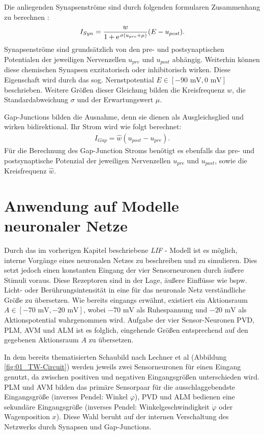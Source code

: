 	Die anliegenden Synapsenströme sind durch folgenden formularen Zusammenhang zu berechnen \cite{WormLevelRL}:
	\begin{align}
		\label{eq:chem_syn_current}
		I_{Syn} = \frac{w}{1 + \e^{\sigma(u_{pre} + \mu)}}(E - u_{post})\text{.}
	\end{align}
	Synapsenströme sind grundsätzlich von den pre- und postsynaptischen Potentialen der jeweiligen Nervenzellen $u_{pre}$ und $u_{post}$ abhängig. Weiterhin können diese chemischen Synapsen exzitatorisch oder inhibitorisch wirken. Diese Eigenschaft wird durch das sog. Nernstpotential $E\in[-90\text{ mV}, 0\text{ mV}]$ beschrieben. Weitere Größen dieser Gleichung bilden die Kreisfrequenz $w$, die Standardabweichung $\sigma$ und der Erwartungswert $\mu$.
	
	Gap-Junctions bilden die Ausnahme, denn sie dienen als Ausgleichsglied und wirken bidirektional. Ihr Strom wird wie folgt berechnet:
	\begin{align}
		\label{eq:gap_syn_current}
		I_{Gap} = \hat{w}(u_{post} - u_{pre})\text{.}
	\end{align}
	Für die Berechnung des Gap-Junction Stroms benötigt es ebenfalls das pre- und postsynaptische Potenzial der jeweiligen Nervenzellen $u_{pre}$ und $u_{post}$, sowie die Kreisfrequenz $\hat{w}$.\newpage
	
\section{Anwendung auf Modelle neuronaler Netze}
\label{sec:lif_neuro}
	Durch das im vorherigen Kapitel beschriebene \textit{LIF} - Modell ist es möglich, interne Vorgänge eines neuronalen Netzes zu beschreiben und zu simulieren. Dies setzt jedoch einen konstanten Eingang der vier Sensorneuronen durch äußere Stimuli voraus. Diese Rezeptoren sind in der Lage, äußere Einflüsse wie bspw. Licht- oder Berührungsintensität in eine für das neuronale Netz verständliche Größe zu übersetzen. Wie bereits eingangs erwähnt, existiert ein Aktionsraum $A\in[-70\text{ mV}, -20\text{ mV}]$, wobei $-70\text{ mV}$ als Ruhespannung und $-20\text{ mV}$ als Aktionspotential wahrgenommen wird. Aufgabe der vier Sensor-Neuronen PVD, PLM, AVM und ALM ist es folglich, eingehende Größen entsprechend auf den gegebenen Aktionsraum $A$ zu übersetzen.
	
	In dem bereits thematisierten Schaubild nach Lechner et al (Abbildung \ref{fig:01_TW-Circuit}) werden jeweils zwei Sensorneuronen für einen Eingang genutzt, da zwischen positiven und negativen Eingangsgrößen unterschieden wird. PLM und AVM bilden das primäre Sensorpaar für die ausschlaggebendste Eingangsgröße (inverses Pendel: Winkel $\varphi$), PVD und ALM bedienen eine sekundäre Eingangsgröße (inverses Pendel: Winkelgeschwindigkeit $\dot{\varphi}$ oder Wagenposition $x$). Diese Wahl beruht auf der internen Verschaltung des Netzwerks durch Synapsen und Gap-Junctions.
	
